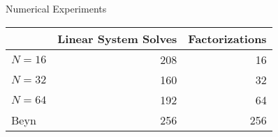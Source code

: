 \documentclass[mathserif, xcolor=table]{beamer}
\begin{document}
\begin{frame}{Numerical Experiments}
	\begin{table}
		\small
		\centering
		\begin{tabular}{lrr}
			\toprule
			\hspace{11em} & Linear System Solves & Factorizations \\
			\midrule
			\( N=16 \) & 208 & 16 \\
			\( N=32 \) & 160 & 32 \\
			\( N=64 \) & 192 & 64 \\
			\rowcolor{blue!10}
			Beyn       & 256 & 256 \\
			\bottomrule
		\end{tabular}
	\end{table}





  
\end{frame}
\end{document}
